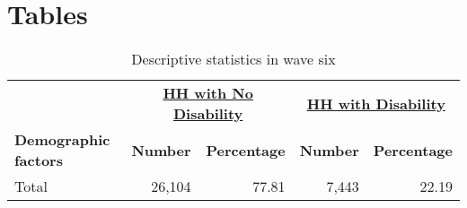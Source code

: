 
\section{Tables}

\noindent
\begin{table}[H] 
\centering 
\footnotesize
\caption{Descriptive statistics in wave six} 
\begin{tabular}{lrrrr}
\hline 
& \multicolumn{2}{c}{\underline{\bf{HH with No Disability}}} & \multicolumn{2}{c}{\underline{\bf{HH with Disability}}} \\
{\bf{Demographic factors}} & {\bf{Number}} & {\bf{Percentage}} & {\bf{Number}} & {\bf{Percentage}} \\
\hline 
Total                     & 26,104      & 77.81       & 7,443    & 22.19 \\


\hline 
\end{tabular}
\label{tab:DescStats}
\end{table}

